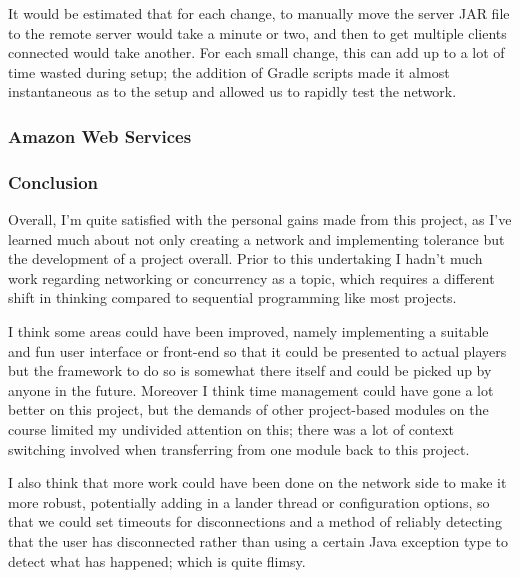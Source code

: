 \documentclass[11pt]{article}
\begin{document}
It would be estimated that for each change, to manually move the server JAR file to the remote server would take a minute or two, and then to get multiple clients connected would take another. For each small change, this can add up to a lot of time wasted during setup; the addition of Gradle scripts made it almost instantaneous as to the setup and allowed us to rapidly test the network.

\subsubsection*{Amazon Web Services}

\subsubsection*{Conclusion}

Overall, I'm quite satisfied with the personal gains made from this project, as I've learned much about not only creating a network and implementing tolerance but the development of a project overall. Prior to this undertaking I hadn't much work regarding networking or concurrency as a topic, which requires a different shift in thinking compared to sequential programming like most projects.

I think some areas could have been improved, namely implementing a suitable and fun user interface or front-end so that it could be presented to actual players but the framework to do so is somewhat there itself and could be picked up by anyone in the future. Moreover I think time management could have gone a lot better on this project, but the demands of other project-based modules on the course limited my undivided attention on this; there was a lot of context switching involved when transferring from one module back to this project. 

I also think that more work could have been done on the network side to make it more robust, potentially adding in a lander thread or configuration options, so that we could set timeouts for disconnections and a method of reliably detecting that the user has disconnected rather than using a certain Java exception type to detect what has happened; which is quite flimsy. 
\end{document}
